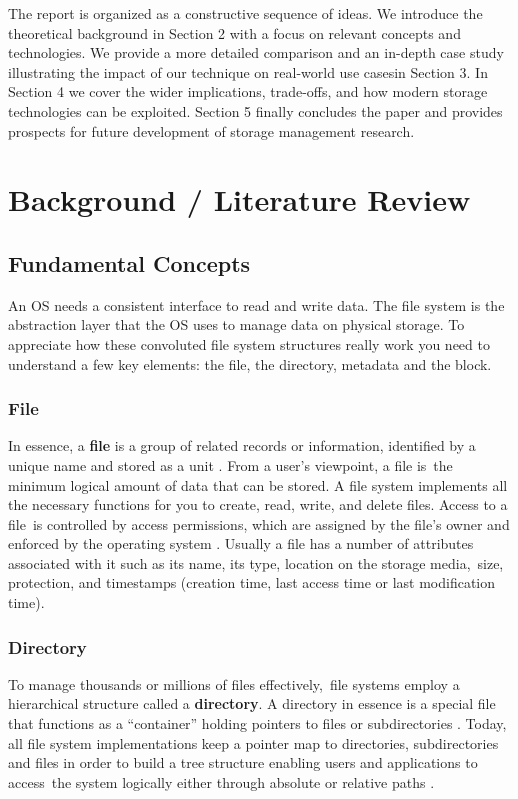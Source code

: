 \documentclass[12pt]{article}
\begin{document}
The report is organized as a constructive sequence of ideas. We introduce the theoretical background in Section 2 with a focus on relevant concepts and technologies. We provide a more detailed comparison and an in-depth case study illustrating the impact of our technique on real-world use casesin Section 3. In Section 4 we cover the wider implications, trade-offs, and how modern storage technologies can be exploited. Section 5 finally concludes the paper and provides prospects for future development of storage management research.


\section{Background / Literature Review}

\subsection{Fundamental Concepts}

An OS needs a consistent interface to read and write data. The file system is the abstraction layer that the OS uses to manage data on physical storage. To appreciate how these convoluted file system structures really work you need to understand a few key elements: the file, the directory, metadata and the block.

\subsubsection{File}
In essence, a \textbf{file} is a group of related records or information, identified by a unique name and stored as a unit \parencite{EMC2012InformationStorage}. From a user's viewpoint, a file is the minimum logical amount of data that can be stored. A file system implements all the necessary functions for you to create, read, write, and delete files. Access to a file is controlled by access permissions, which are assigned by the file's owner and enforced by the operating system \parencite{Silberschatz2018}. Usually a file has a number of attributes associated with it such as its name, its type, location on the storage media, size, protection, and timestamps (creation time, last access time or last modification time).


\subsubsection{Directory}
To manage thousands or millions of files effectively, file systems employ a hierarchical structure called a \textbf{directory}. A directory in essence is a special file that functions as a “container” holding pointers to files or subdirectories \parencite{EMC2012InformationStorage}. Today, all file system implementations keep a pointer map to directories, subdirectories and files in order to build a tree structure enabling users and applications to access the system logically either through absolute or relative paths \parencite{Tanenbaum2014}. 
\end{document}
